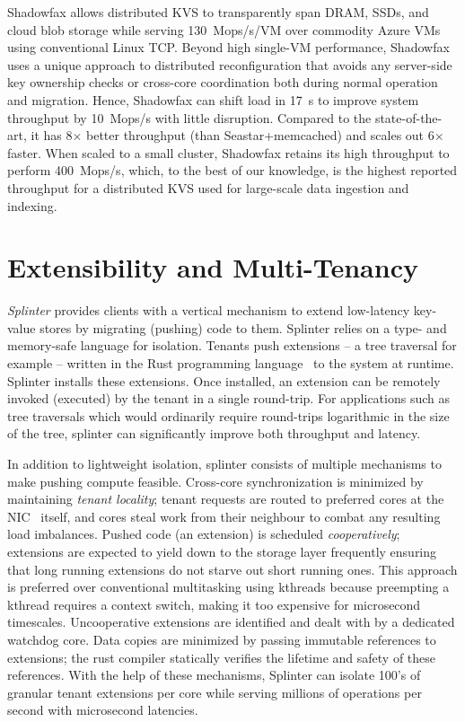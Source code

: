 Shadowfax allows distributed KVS to
transparently span DRAM, SSDs, and cloud blob storage while serving
130~Mops/s/VM over commodity Azure VMs using conventional Linux TCP.
%
Beyond
high single-VM performance, Shadowfax uses a unique approach to distributed
reconfiguration that avoids any server-side key ownership checks
or cross-core coordination both during normal operation and migration.
%
Hence,
Shadowfax can shift load in 17~s to improve system throughput by
10~Mops/s
with little disruption. Compared to the state-of-the-art, it has 8$\times{}$ better throughput
  (than Seastar+memcached) and scales out 6$\times{}$ faster.
%
When scaled to a small cluster, Shadowfax retains its high throughput to
perform 400~Mops/s,
%
which, to the best of our knowledge, is the highest
reported throughput for a distributed KVS used for
large-scale data ingestion and indexing.

\section{Extensibility and Multi-Tenancy}

\emph{Splinter} provides clients with a vertical mechanism
to extend low-latency key-value stores by migrating (pushing) code to them.
%
Splinter relies on a type- and memory-safe language for isolation.
%
Tenants push
extensions – a tree traversal for example – written in the Rust
programming language~\cite{rust} to the system at runtime.
%
Splinter installs
these extensions.
%
Once installed, an extension can
be remotely invoked (executed) by the tenant in a
single round-trip.
%
For applications such as tree traversals which would ordinarily require
round-trips logarithmic in the size of the tree, splinter can
significantly improve both throughput and latency.

In addition to lightweight isolation, splinter consists of multiple
mechanisms to make pushing compute feasible.
%
Cross-core synchronization
is minimized by maintaining \emph{tenant locality}; tenant requests are
routed
to preferred cores at the NIC~\cite{flow-director} itself, and cores
steal work from
their neighbour to combat any resulting load imbalances.
%
Pushed code (an extension) is scheduled \emph{cooperatively}; extensions are
expected to yield down to the storage layer frequently ensuring that
long running extensions do not starve out short running ones.
%
This
approach is preferred over conventional multitasking using kthreads
because preempting a kthread requires a context switch, making it too
expensive for microsecond timescales.
%
Uncooperative extensions are
identified and dealt with by a dedicated watchdog core.
%
Data copies are
minimized by passing immutable references to extensions; the rust
compiler statically verifies the lifetime and safety of these
references.
%
With the help of these mechanisms, Splinter can isolate
100’s of granular tenant extensions per core while serving millions of
operations per second with microsecond latencies.

